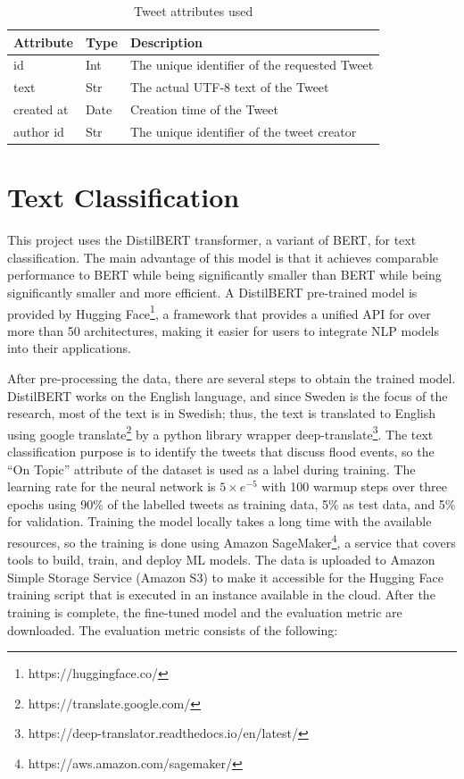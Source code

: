 \begin{table}
  \center
  \label{tab:tweet_attr}
  \begin{tabular}{|l|l|l|}
    \hline
    Attribute & Type & Description \\
    \hline
    id & Int & The unique identifier of the requested Tweet \\
    \hline
    text & Str & The actual UTF-8 text of the Tweet \\
    \hline
    created at & Date  & Creation time of the Tweet \\
    \hline
    author id & Str & The unique identifier of the tweet creator \\
    \hline
  \end{tabular}
  \caption{Tweet attributes used}
\end{table}

\section{Text Classification}
This project uses the DistilBERT transformer\cite{Sanh2019DistilBERTAD}, a variant of BERT, for text
classification.  The main advantage of this model is that it achieves comparable performance to BERT
while being significantly smaller than BERT while being significantly smaller and more efficient. A
DistilBERT pre-trained model is provided by Hugging Face\footnote{https://huggingface.co/}, a
framework that provides a unified API for over more than 50 architectures, making it easier for
users to integrate \ac{NLP} models into their applications.

After pre-processing the data, there are several steps to obtain the trained model. DistilBERT works
on the English language, and since Sweden is the focus of the research, most of the text is in
Swedish; thus, the text is translated to English using google
translate\footnote{https://translate.google.com/} by a python library wrapper
deep-translate\footnote{https://deep-translator.readthedocs.io/en/latest/}. The text classification
purpose is to identify the tweets that discuss flood events, so the ``On Topic'' attribute of the
dataset is used as a label during training. The learning rate for the neural network is $5\times e^{-5}$ with
100 warmup steps over three epochs using 90\% of the labelled tweets as training data, 5\% as test
data, and 5\% for validation. Training the model locally takes a long time with the available
resources, so the training is done using Amazon
SageMaker\footnote{https://aws.amazon.com/sagemaker/}, a service that covers tools to build, train,
and deploy \ac{ML} models. The data is uploaded to Amazon Simple Storage Service (Amazon S3) to make it
accessible for the Hugging Face training script that is executed in an instance available in the
cloud. After the training is complete, the fine-tuned model and the evaluation metric are
downloaded. The evaluation metric consists of the following:

